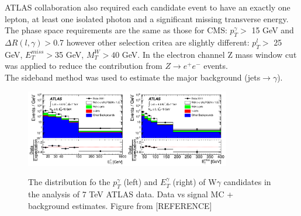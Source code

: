 

ATLAS collaboration also required each candidate event to have an exactly one lepton, at least one isolated photon and a significant missing transverse energy. The phase space requirements are the same as those for CMS: $p_T^{\gamma}>$ 15 GeV and $\Delta R(l,\gamma)>$0.7 however other selection critea are slightly different: $p_T^l>$ 25 GeV, $E_T^{miss}>$35 GeV, $M_T^W>40$ GeV. In the electron channel Z mass window cut was applied to reduce the contribution from $Z\rightarrow e^+e^-$ events.\\

The sideband method was used to estimate the major background (jets$\rightarrow\gamma$). 

\begin{figure}[htb]
  \begin{center}
    {\includegraphics[width=0.80\textwidth]{../figs/WgAbout/Wg7TeV_ATLAS_ptGamma.png}}
    \caption{The distribution fo the $p_T^\gamma$ (left) and $E_T^\gamma$ (right) of W$\gamma$ candidates in the analysis of 7 TeV ATLAS data. Data vs signal MC + background estimates. Figure from [REFERENCE]}
    \label{fig:Wg7TeV_ATLAS_ptGamma}
  \end{center}
\end{figure}




